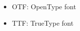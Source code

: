 \documentclass[12pt]{article}
\begin{document}
\begin{itemize}
\item OTF: OpenType font
\item TTF: TrueType font
\end{itemize}
\end{document}
